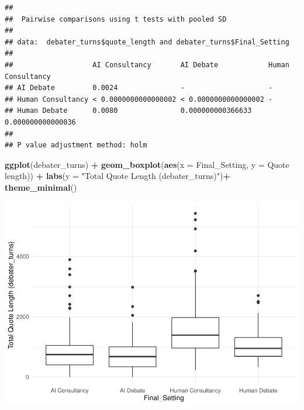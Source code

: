 \documentclass[
]{article}
\newenvironment{Shaded}{\begin{snugshade}}{\end{snugshade}}
\newcommand{\AttributeTok}[1]{\textcolor[rgb]{0.13,0.29,0.53}{#1}}
\newcommand{\FunctionTok}[1]{\textcolor[rgb]{0.13,0.29,0.53}{\textbf{#1}}}
\newcommand{\NormalTok}[1]{#1}
\newcommand{\SpecialCharTok}[1]{\textcolor[rgb]{0.81,0.36,0.00}{\textbf{#1}}}
\newcommand{\StringTok}[1]{\textcolor[rgb]{0.31,0.60,0.02}{#1}}
\begin{document}
\begin{Shaded}
\end{Shaded}

\begin{verbatim}
## 
##  Pairwise comparisons using t tests with pooled SD 
## 
## data:  debater_turns$quote_length and debater_turns$Final_Setting 
## 
##                   AI Consultancy       AI Debate            Human Consultancy
## AI Debate         0.0024               -                    -                
## Human Consultancy < 0.0000000000000002 < 0.0000000000000002 -                
## Human Debate      0.0080               0.000000000366633    0.000000000000036
## 
## P value adjustment method: holm
\end{verbatim}

\begin{Shaded}
\begin{Highlighting}[]
\FunctionTok{ggplot}\NormalTok{(debater\_turns) }\SpecialCharTok{+}
  \FunctionTok{geom\_boxplot}\NormalTok{(}\FunctionTok{aes}\NormalTok{(}\AttributeTok{x =}\NormalTok{ Final\_Setting, }\AttributeTok{y =} \StringTok{\textasciigrave{}}\AttributeTok{Quote length}\StringTok{\textasciigrave{}}\NormalTok{)) }\SpecialCharTok{+}
  \FunctionTok{labs}\NormalTok{(}\AttributeTok{y =} \StringTok{"Total Quote Length (debater\_turns)"}\NormalTok{)}\SpecialCharTok{+}
  \FunctionTok{theme\_minimal}\NormalTok{()}
\end{Highlighting}
\end{Shaded}

\includegraphics[width=1\linewidth]{debate-2309_files/figure-latex/quote_length graph-3}
\end{document}
